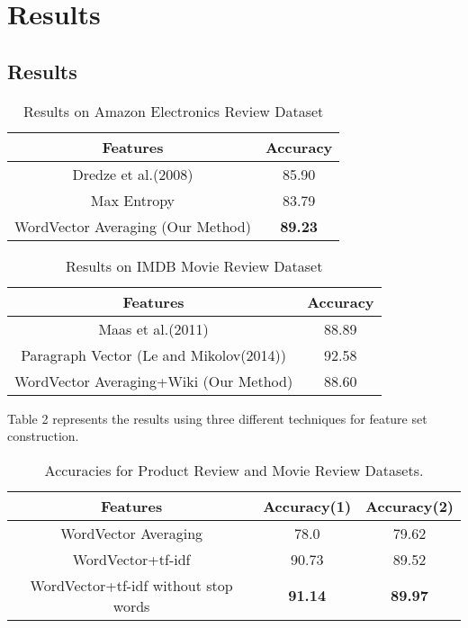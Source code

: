 \chapter{Results}
\section{Results}
\begin {table}[h!]
\centering
\begin{tabular}{ | c | c | }
\hline
\textbf{Features} & \textbf{Accuracy} \\ \hline
Dredze et al.(2008) & 85.90\\ \hline
Max Entropy & 83.79\\ \hline
WordVector Averaging (Our Method) & \textbf{89.23}\\ \hline
\end{tabular}
\caption {Results on Amazon Electronics Review Dataset}
\end{table}

\begin {table}[h!]
\centering
\begin{tabular}{ | c | c | }
\hline
\textbf{Features} & \textbf{Accuracy} \\ \hline
Maas et al.(2011) & 88.89\\ \hline
Paragraph Vector (Le and Mikolov(2014)) & 92.58\\ \hline
WordVector Averaging+Wiki (Our Method) & 88.60\\ \hline
\end{tabular}
\caption {Results on IMDB Movie Review Dataset}
\end{table}

Table 2 represents the results using three different techniques for feature set construction.
\begin {table}[h!]
\centering
\begin{tabular}{ | c | c | c | }
\hline
\textbf{Features} & \textbf{Accuracy(1)} & \textbf{Accuracy(2)} \\ \hline
WordVector Averaging & 78.0 & 79.62\\ \hline
WordVector+tf-idf & 90.73 & 89.52\\ \hline
WordVector+tf-idf without stop words & \textbf{91.14} & \textbf{89.97}\\ \hline
\end{tabular}
\caption {Accuracies for Product Review and Movie Review Datasets.}
\end{table}

